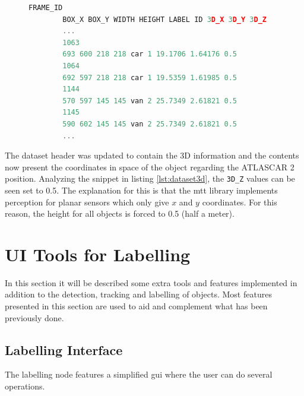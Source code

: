 \begin{figure}
	\begin{center}
		\begin{lstlisting}[label={lst:dataset3d}, caption={Snippet of the dataset with 3D capabilities},language=c++]
		FRAME_ID
		BOX_X BOX_Y WIDTH HEIGHT LABEL ID 3D_X 3D_Y 3D_Z
		...
		1063
		693 600 218 218 car 1 19.1706 1.64176 0.5
		1064
		692 597 218 218 car 1 19.5359 1.61985 0.5
		1144
		570 597 145 145 van 2 25.7349 2.61821 0.5
		1145
		590 602 145 145 van 2 25.7349 2.61821 0.5
		...		\end{lstlisting}
	\end{center}
\end{figure}

The dataset header was updated to contain the 3D information and the contents now present the coordinates in space of the object regarding the ATLASCAR 2 position. Analyzing the snippet in listing \ref{lst:dataset3d}, the \texttt{3D\_Z} values can be seen set to 0.5. The explanation for this is that the \gls{mtt} library implements perception for planar sensors which only give $x$ and $y$ coordinates. For this reason, the height for all objects is forced to 0.5 (half a meter). 

\section{UI Tools for Labelling}

In this section it will be described some extra tools and features implemented in addition to the detection, tracking and labelling of objects. Most features presented in this section are used to aid and complement what has been previously done.

\subsection{Labelling Interface}

The labelling node features a simplified \gls{gui} where the user can do several operations.

